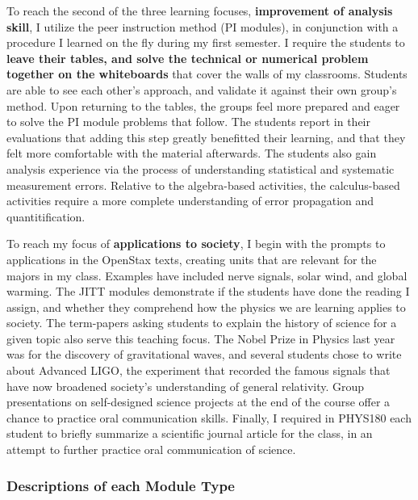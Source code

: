 \documentclass[../../../main.tex]{subfiles}
\begin{document}
To reach the second of the three learning focuses, \textbf{improvement of analysis skill}, I utilize the peer instruction method (PI modules), in conjunction with a procedure I learned on the fly during my first semester.  I require the students to \textbf{leave their tables, and solve the technical or numerical problem together on the whiteboards} that cover the walls of my classrooms.  Students are able to see each other's approach, and validate it against their own group's method.  Upon returning to the tables, the groups feel more prepared and eager to solve the PI module problems that follow.  The students report in their evaluations that adding this step greatly benefitted their learning, and that they felt more comfortable with the material afterwards.  The students also gain analysis experience via the process of understanding statistical and systematic measurement errors.  Relative to the algebra-based activities, the calculus-based activities require a more complete understanding of error propagation and quantitification. \\ \hspace{0.1cm}

To reach my focus of \textbf{applications to society}, I begin with the prompts to applications in the OpenStax texts, creating units that are relevant for the majors in my class.  Examples have included nerve signals, solar wind, and global warming.  The JITT modules demonstrate if the students have done the reading I assign, and whether they comprehend how the physics we are learning applies to society. The term-papers asking students to explain the history of science for a given topic also serve this teaching focus.  The Nobel Prize in Physics last year was for the discovery of gravitational waves, and several students chose to write about Advanced LIGO, the experiment that recorded the famous signals that have now broadened society's understanding of general relativity.  Group presentations on self-designed science projects at the end of the course offer a chance to practice oral communication skills.  Finally, I required in PHYS180 each student to briefly summarize a scientific journal article for the class, in an attempt to further practice oral communication of science. \\ \hspace{0.1cm}

\subsubsection{Descriptions of each Module Type}
\end{document}
